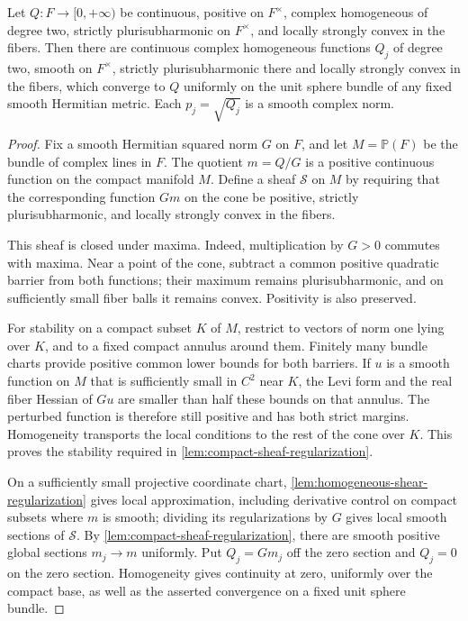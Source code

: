\begin{theorem}\label{thm:homogeneous-convex-regularization}
Let $Q\colon F\to[0,+\infty)$ be continuous, positive on $F^\times$, complex homogeneous of degree two, strictly plurisubharmonic on $F^\times$, and locally strongly convex in the fibers. Then there are continuous complex homogeneous functions $Q_j$ of degree two, smooth on $F^\times$, strictly plurisubharmonic there and locally strongly convex in the fibers, which converge to $Q$ uniformly on the unit sphere bundle of any fixed smooth Hermitian metric. Each $p_j=\sqrt{Q_j}$ is a smooth complex norm.
\end{theorem}
\begin{proof}
Fix a smooth Hermitian squared norm $G$ on $F$, and let $M=\mathbb P(F)$ be the bundle of complex lines in $F$. The quotient $m=Q/G$ is a positive continuous function on the compact manifold $M$. Define a sheaf $\mathcal S$ on $M$ by requiring that the corresponding function $Gm$ on the cone be positive, strictly plurisubharmonic, and locally strongly convex in the fibers.

This sheaf is closed under maxima. Indeed, multiplication by $G>0$ commutes with maxima. Near a point of the cone, subtract a common positive quadratic barrier from both functions; their maximum remains plurisubharmonic, and on sufficiently small fiber balls it remains convex. Positivity is also preserved.

For stability on a compact subset $K$ of $M$, restrict to vectors of norm one lying over $K$, and to a fixed compact annulus around them. Finitely many bundle charts provide positive common lower bounds for both barriers. If $u$ is a smooth function on $M$ that is sufficiently small in $C^2$ near $K$, the Levi form and the real fiber Hessian of $Gu$ are smaller than half these bounds on that annulus. The perturbed function is therefore still positive and has both strict margins. Homogeneity transports the local conditions to the rest of the cone over $K$. This proves the stability required in \cref{lem:compact-sheaf-regularization}.

On a sufficiently small projective coordinate chart, \cref{lem:homogeneous-shear-regularization} gives local approximation, including derivative control on compact subsets where $m$ is smooth; dividing its regularizations by $G$ gives local smooth sections of $\mathcal S$. By \cref{lem:compact-sheaf-regularization}, there are smooth positive global sections $m_j\to m$ uniformly. Put $Q_j=Gm_j$ off the zero section and $Q_j=0$ on the zero section. Homogeneity gives continuity at zero, uniformly over the compact base, as well as the asserted convergence on a fixed unit sphere bundle.


\end{proof}
